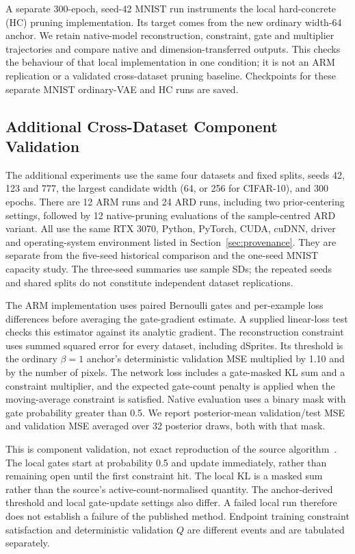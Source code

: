 \documentclass[make,article,submit,pdftex,moreauthors]{Definitions/mdpi}
\begin{document}
A separate 300-epoch, seed-42 MNIST run instruments the local
hard-concrete (HC) pruning implementation. Its target comes from the
new ordinary width-64 anchor. We retain native-model reconstruction,
constraint, gate and multiplier trajectories and compare native and
dimension-transferred outputs. This checks the behaviour of that local
implementation in one condition; it is not an ARM replication or a
validated cross-dataset pruning baseline. Checkpoints for these separate
MNIST ordinary-VAE and HC runs are saved.

\subsection{Additional Cross-Dataset Component Validation}\label{sec:gpuvalidation}
The additional experiments use the same four datasets and fixed splits,
seeds 42, 123 and 777, the largest candidate width (64, or 256 for
CIFAR-10), and 300 epochs. There are 12 ARM runs and 24 ARD runs,
including two prior-centering settings, followed by 12 native-pruning
evaluations of the sample-centred ARD variant. All use the same RTX 3070,
Python, PyTorch, CUDA, cuDNN, driver and operating-system environment
listed in Section~\ref{sec:provenance}. They are separate from the
five-seed historical comparison and the one-seed MNIST capacity study.
The three-seed summaries use sample SDs; the repeated seeds and shared
splits do not constitute independent dataset replications.

The ARM implementation uses paired Bernoulli gates and per-example
loss differences before averaging the gate-gradient estimate. A supplied
linear-loss test checks this estimator against its analytic gradient.
The reconstruction constraint uses summed squared error for every
dataset, including dSprites. Its threshold is the ordinary $\beta=1$
anchor's deterministic validation MSE multiplied by 1.10 and by the
number of pixels. The network loss includes a gate-masked KL sum and
a constraint multiplier, and the expected gate-count penalty is applied
when the moving-average constraint is satisfied. Native evaluation
uses a binary mask with gate probability greater than 0.5. We report
posterior-mean validation/test MSE and validation MSE averaged over
32 posterior draws, both with that mask.

This is component validation, not exact reproduction of the source
algorithm~\cite{deboom2020geco}. The local gates start at probability
0.5 and update immediately, rather than remaining open until the first
constraint hit. The local KL is a masked sum rather than the source's
active-count-normalised quantity. The anchor-derived threshold and
local gate-update settings also differ. A failed local run therefore
does not establish a failure of the published method. Endpoint training
constraint satisfaction and deterministic validation $Q$ are different
events and are tabulated separately.
\end{document}
